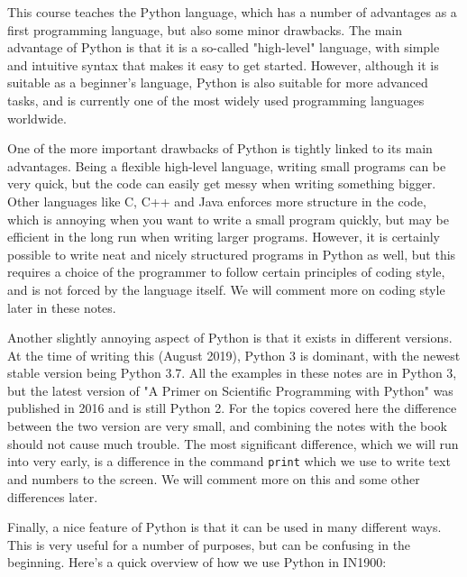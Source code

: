 \documentclass[graybox,envcountchap,sectrefs,final]{svmonodo}
\begin{document}
This course teaches the Python language, which has a number of advantages as a first programming language, but also
some minor drawbacks. The main advantage of Python is that it is a so-called "high-level" language, with simple and
intuitive syntax that makes it easy to get started. However, although it is suitable as a beginner's language, Python is also
suitable for more advanced tasks, and is currently one of the most widely used programming languages worldwide.

One of the more important drawbacks of Python is tightly linked to its main advantages. Being a flexible high-level
language, writing small programs can be very quick, but the code can easily get messy when writing something bigger.
Other languages like C, C++ and Java enforces more structure in the code, which is annoying when you want to write
a small program quickly, but may be efficient in the long run when writing larger programs. However, it is
certainly possible to write neat and nicely structured programs in Python as well, but this requires
a choice of the programmer to follow certain principles of coding style, and is not forced by the language itself.
We will comment more on coding style later in these notes.

Another slightly annoying aspect of Python is that it exists in different versions. At the time of writing this
(August 2019), Python 3 is dominant, with the newest stable version being Python 3.7.
All the examples in these notes are in Python 3, but the latest version of
"A Primer on Scientific Programming with Python" was published in 2016 and is still Python 2. For the topics covered
here the difference between the two version are very small, and combining the notes with the book should not
cause much trouble. The most significant difference, which we will run into very early, is a difference in
the command \texttt{print} which we use to write text and numbers to the screen. We will comment more on this and some
other differences later.

Finally, a nice feature of Python is that it can be used in many different ways. This is very
useful for a number of purposes, but can be confusing in the beginning. Here's a quick overview of how
we use Python in IN1900:
\end{document}
